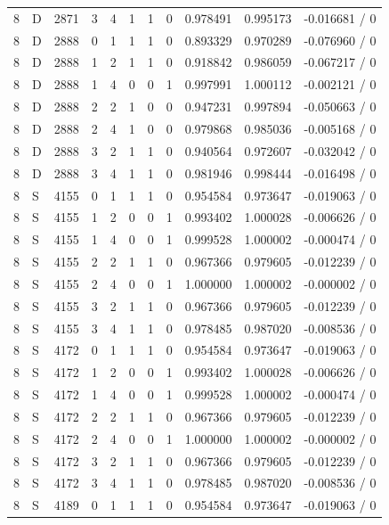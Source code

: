 \begin{longtable}{@{}rlrrlrrrrrr@{}}
8 & D & 2871 & 3 & 4 & 1 & 1 & 0 & 0.978491 & 0.995173 & -0.016681 / 0 \\
8 & D & 2888 & 0 & 1 & 1 & 1 & 0 & 0.893329 & 0.970289 & -0.076960 / 0 \\
8 & D & 2888 & 1 & 2 & 1 & 1 & 0 & 0.918842 & 0.986059 & -0.067217 / 0 \\
8 & D & 2888 & 1 & 4 & 0 & 0 & 1 & 0.997991 & 1.000112 & -0.002121 / 0 \\
8 & D & 2888 & 2 & 2 & 1 & 0 & 0 & 0.947231 & 0.997894 & -0.050663 / 0 \\
8 & D & 2888 & 2 & 4 & 1 & 0 & 0 & 0.979868 & 0.985036 & -0.005168 / 0 \\
8 & D & 2888 & 3 & 2 & 1 & 1 & 0 & 0.940564 & 0.972607 & -0.032042 / 0 \\
8 & D & 2888 & 3 & 4 & 1 & 1 & 0 & 0.981946 & 0.998444 & -0.016498 / 0 \\
8 & S & 4155 & 0 & 1 & 1 & 1 & 0 & 0.954584 & 0.973647 & -0.019063 / 0 \\
8 & S & 4155 & 1 & 2 & 0 & 0 & 1 & 0.993402 & 1.000028 & -0.006626 / 0 \\
8 & S & 4155 & 1 & 4 & 0 & 0 & 1 & 0.999528 & 1.000002 & -0.000474 / 0 \\
8 & S & 4155 & 2 & 2 & 1 & 1 & 0 & 0.967366 & 0.979605 & -0.012239 / 0 \\
8 & S & 4155 & 2 & 4 & 0 & 0 & 1 & 1.000000 & 1.000002 & -0.000002 / 0 \\
8 & S & 4155 & 3 & 2 & 1 & 1 & 0 & 0.967366 & 0.979605 & -0.012239 / 0 \\
8 & S & 4155 & 3 & 4 & 1 & 1 & 0 & 0.978485 & 0.987020 & -0.008536 / 0 \\
8 & S & 4172 & 0 & 1 & 1 & 1 & 0 & 0.954584 & 0.973647 & -0.019063 / 0 \\
8 & S & 4172 & 1 & 2 & 0 & 0 & 1 & 0.993402 & 1.000028 & -0.006626 / 0 \\
8 & S & 4172 & 1 & 4 & 0 & 0 & 1 & 0.999528 & 1.000002 & -0.000474 / 0 \\
8 & S & 4172 & 2 & 2 & 1 & 1 & 0 & 0.967366 & 0.979605 & -0.012239 / 0 \\
8 & S & 4172 & 2 & 4 & 0 & 0 & 1 & 1.000000 & 1.000002 & -0.000002 / 0 \\
8 & S & 4172 & 3 & 2 & 1 & 1 & 0 & 0.967366 & 0.979605 & -0.012239 / 0 \\
8 & S & 4172 & 3 & 4 & 1 & 1 & 0 & 0.978485 & 0.987020 & -0.008536 / 0 \\
8 & S & 4189 & 0 & 1 & 1 & 1 & 0 & 0.954584 & 0.973647 & -0.019063 / 0 \\

\end{longtable}
